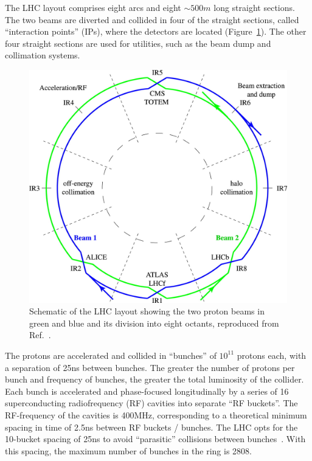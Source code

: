 The LHC layout comprises eight arcs and eight $\sim 500\unit{m}$ long straight sections.
The two beams are diverted and collided in four of the straight sections, called ``interaction points'' (IPs), where the detectors are located (Figure~\ref{fig:02_lhc_octants}).
The other four straight sections are used for utilities, such as the beam dump and collimation systems.

\begin{figure}[ht!]
    \centering
    \includegraphics[width=\textwidth]{figures/02-CMS/lhc/lhc_octants.jpg}
    \caption{Schematic of the LHC layout showing the two proton beams in green and blue and its division into eight octants, reproduced from Ref.~\cite{Bruning:2012zz}.}
    \label{fig:02_lhc_octants}
\end{figure}

The protons are accelerated and collided in ``bunches'' of $10^{11}$ protons each, with a separation of 25\unit{ns} between bunches.
The greater the number of protons per bunch and frequency of bunches, the greater the total luminosity of the collider.
Each bunch is accelerated and phase-focused longitudinally by a series of 16 superconducting radiofrequency (RF) cavities into separate ``RF buckets''.
The RF-frequency of the cavities is 400\unit{MHz}, corresponding to a theoretical minimum spacing in time of 2.5\unit{ns} between RF buckets / bunches.
The LHC opts for the 10-bucket spacing of 25\unit{ns} to avoid ``parasitic'' collisions between bunches~\cite{Bruning:2012zz}.
With this spacing, the maximum number of bunches in the ring is 2808.



